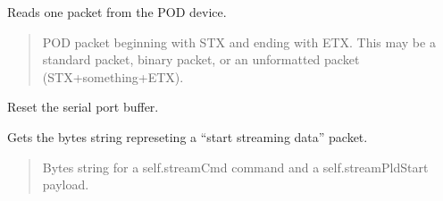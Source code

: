 \documentclass[letterpaper,10pt,english]{sphinxmanual}
\begin{document}
\begin{fulllineitems}
\begin{fulllineitems}
\end{fulllineitems}


\begin{fulllineitems}
\label{\detokenize{PodApi.Stream.Collect:PodApi.Stream.Collect.DeviceValve.Valve.Drip}}
\pysigstartsignatures
{}
\pysigstopsignatures
\sphinxAtStartPar
Reads one packet from the POD device.
\begin{quote}\begin{description}
\sphinxAtStartPar
POD packet beginning with STX and ending with ETX.                 This may be a standard packet, binary packet, or an                 unformatted packet (STX+something+ETX).

\sphinxAtStartPar
{\hyperref[\detokenize{PodApi.Packets:PodApi.Packets.Packet.Packet}]{}}

\end{description}\end{quote}

\end{fulllineitems}


\begin{fulllineitems}
\label{\detokenize{PodApi.Stream.Collect:PodApi.Stream.Collect.DeviceValve.Valve.EmptyValve}}
\pysigstartsignatures
{}
\pysigstopsignatures
\sphinxAtStartPar
Reset the serial port buffer.

\end{fulllineitems}


\begin{fulllineitems}
\label{\detokenize{PodApi.Stream.Collect:PodApi.Stream.Collect.DeviceValve.Valve.GetStartBytes}}
\pysigstartsignatures
{}
\pysigstopsignatures
\sphinxAtStartPar
Gets the bytes string represeting a “start streaming data” packet.
\begin{quote}\begin{description}
\sphinxAtStartPar
Bytes string for a self.streamCmd command and a                 self.streamPldStart payload.


\end{description}
\end{quote}
\end{fulllineitems}
\end{fulllineitems}
\end{document}
